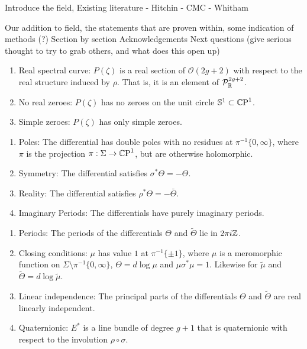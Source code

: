 \documentclass{article}
\begin{document}
Introduce the field, Existing literature
- Hitchin
- CMC
- Whitham

Our addition to field, the statements that are proven within, some indication of methods (?)
Section by section
Acknowledgements
Next questions (give serious thought to try to grab others, and what does this open up)

\begin{enumerate}[label=(P.\arabic*)]
\item\label{P:real curve} Real spectral curve: $P(\zeta)$ is a real section of $\mathcal{O}(2g+2)$ with respect to the real structure induced by $\rho$. That is, it is an element of $\mathcal{P}^{2g+2}_{\mathbb{R}}$.
\item\label{P:no real zeroes} No real zeroes: $P(\zeta)$ has no zeroes on the unit circle $\mathbb{S}^1\subset\mathbb{C}\text{P}^1$.
\item\label{P:simple zeroes} Simple zeroes: $P(\zeta)$ has only simple zeroes.
\end{enumerate}
\begin{enumerate}[resume*]
\item\label{P:poles} Poles: The differential has double poles with no residues at $\pi^{-1}\{0,\infty\}$, where $\pi$ is the projection $\pi: \Sigma \to \mathbb{C}\text{P}^1$, but are otherwise holomorphic.
\item\label{P:symmetry} Symmetry: The differential satisfies $\sigma^* \Theta = - \Theta$.
\item\label{P:reality} Reality: The differential satisfies $\rho^* \Theta = - \bar{\Theta}$.
\item\label{P:imaginary periods} Imaginary Periods: The differentials have purely imaginary periods.
\end{enumerate}
\begin{enumerate}[resume*]
\item\label{P:periods} Periods: The periods of the differentials $\Theta$ and $\tilde{\Theta}$ lie in $2\pi i\mathbb{Z}$.
\item\label{P:closing} Closing conditions: $\mu$ has value $1$ at $\pi^{-1}\{\pm 1\}$, where $\mu$ is a meromorphic function on $\Sigma\setminus \pi^{-1}\{0,\infty\}$, $\Theta = d\log \mu$ and $\mu\sigma^*\mu = 1$. Likewise for $\tilde{\mu}$ and $\tilde{\Theta}=d\log \tilde{\mu}$.
\item\label{P:linear independence} Linear independence: The principal parts of the differentials $\Theta$ and $\tilde{\Theta}$ are real linearly independent.
\item\label{P:quaternionic} Quaternionic: $E^*$ is a line bundle of degree $g+1$ that is quaternionic with respect to the involution $\rho \circ \sigma$.
\end{enumerate}
\end{document}
